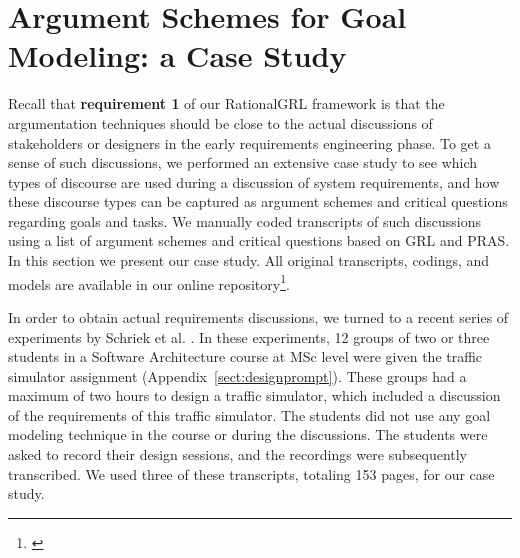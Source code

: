 \section{Argument Schemes for Goal Modeling: a Case Study}
\label{sect:gmas}

Recall that \textbf{requirement 1} of our RationalGRL framework is that the argumentation techniques should be close to the actual discussions of stakeholders or designers in the early requirements engineering phase. To get a sense of such discussions, we performed an extensive case study to see which types of discourse are used during a discussion of system requirements, and how these discourse types can be captured as argument schemes and critical questions regarding goals and tasks. We manually coded transcripts of such discussions using a list of argument schemes and critical questions based on GRL and PRAS. In this section we present our case study. All original transcripts, codings, and models are available in our online repository\footnote{\label{foot:url}}.   

In order to obtain actual requirements discussions, we turned to a recent series of experiments by Schriek et al. \cite{SchriekEtal2016}. In these experiments, 12 groups of two or three students in a Software Architecture course at MSc level were given the traffic simulator assignment (Appendix~\ref{sect:designprompt}). These groups had a maximum of two hours to design a traffic simulator, which included a discussion of the requirements of this traffic simulator. The students did not use any goal modeling technique in the course or during the discussions. The students were asked to record their design sessions, and the recordings were subsequently transcribed. We used three of these transcripts, totaling 153 pages, for our case study. 


